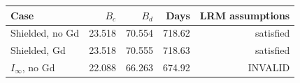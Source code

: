 \begin{center}\small
\begin{tabular}{lrrrr}
\toprule
Case & $B_c$ & $B_d$ & Days & LRM assumptions \\
\midrule
Shielded, no Gd & 23.518 & 70.554 & 718.62 & satisfied \\
Shielded, Gd & 23.518 & 70.555 & 718.63 & satisfied \\
$I_\infty$, no Gd & 22.088 & 66.263 & 674.92 & INVALID \\
\bottomrule
\end{tabular}
\end{center}
